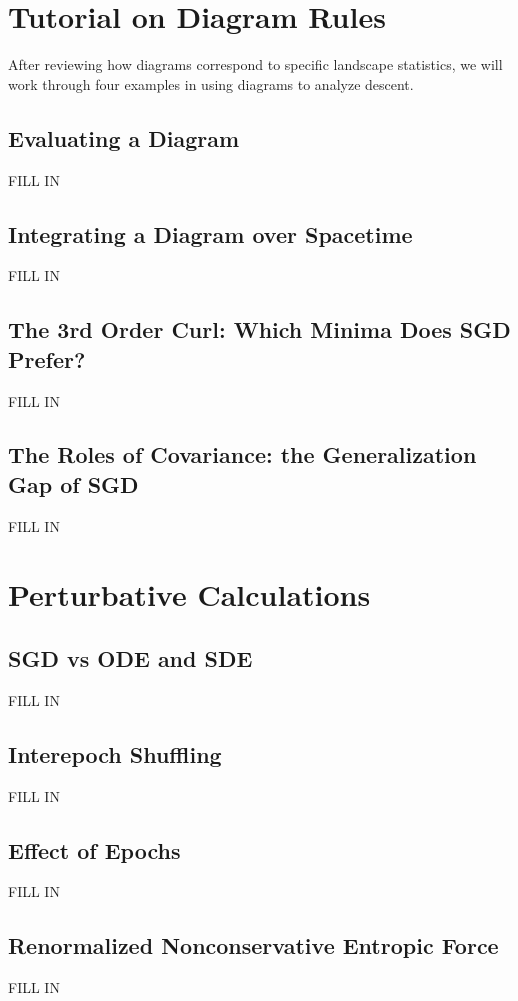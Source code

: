 \documentclass{article}
\begin{document}
\section{Tutorial on Diagram Rules} \label{sect:tutorial}

    After reviewing how diagrams correspond to specific landscape statistics,
    we will work through four examples in using diagrams to analyze descent.

    \subsection{Evaluating a Diagram}
        {\color{moor} FILL IN}
    \subsection{Integrating a Diagram over Spacetime}
        {\color{moor} FILL IN}
    \subsection{The 3rd Order Curl: Which Minima Does SGD Prefer?}
        {\color{moor} FILL IN}
    \subsection{The Roles of Covariance: the Generalization Gap of SGD}
        {\color{moor} FILL IN}
        
\section{Perturbative Calculations} \label{sect:calculations}


    \subsection{SGD vs ODE and SDE}
        {\color{moor} FILL IN}
    \subsection{Interepoch Shuffling}
        {\color{moor} FILL IN}
    \subsection{Effect of Epochs}
        {\color{moor} FILL IN}
    \subsection{Renormalized Nonconservative Entropic Force}
        {\color{moor} FILL IN}
\end{document}
